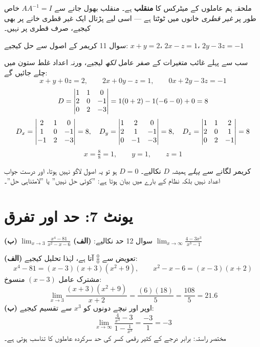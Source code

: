 \begin{ghalti}
ملحقہ ہم عاملوں کے میٹرکس کا \textbf{منقلب} ہے۔ منقلب بھول جانے سے
\(AA^{-1}=I\) خاص طور پر \emph{غیر قطری} خانوں میں ٹوٹتا ہے --- اسی لیے پڑتال
ایک غیر قطری خانے پر بھی کیجیے، صرف قطری پر نہیں۔
\end{ghalti}

\begin{sawal}{سوال \textenglish{11}}
کریمر کے اصول سے حل کیجیے: \quad
\(x+y=2\)، \quad \(2x-z=1\)، \quad \(2y-3z=-1\)
\end{sawal}

\begin{hal}
سب سے پہلے غائب متغیرات کے صفر عامل \emph{لکھ} لیجیے، ورنہ اعداد غلط ستون میں
چلے جائیں گے:
\[
x+y+0z=2,\qquad 2x+0y-z=1,\qquad 0x+2y-3z=-1
\]
\[
D=\begin{vmatrix}1&1&0\\2&0&-1\\0&2&-3\end{vmatrix}=1(0+2)-1(-6-0)+0=8
\]
\[
D_x=\begin{vmatrix}2&1&0\\1&0&-1\\-1&2&-3\end{vmatrix}=8,\quad
D_y=\begin{vmatrix}1&2&0\\2&1&-1\\0&-1&-3\end{vmatrix}=8,\quad
D_z=\begin{vmatrix}1&1&2\\2&0&1\\0&2&-1\end{vmatrix}=8
\]
\[
x=\tfrac88=1,\qquad y=1,\qquad z=1
\]

\end{hal}

\begin{ghalti}
کریمر لگانے سے \emph{پہلے} ہمیشہ \(D\) نکالیے۔ \(D=0\) ہو تو یہ اصول لاگو نہیں
ہوتا، اور درست جواب اعداد نہیں بلکہ نظام کے بارے میں بیان ہوتا ہے: ''کوئی حل
نہیں'' یا ''لامتناہی حل''۔
\end{ghalti}

\section*{یونٹ \textenglish{7}: حد اور تفرق}

\begin{sawal}{سوال \textenglish{12}}
حد نکالیے: \quad
\textbf{(الف)} \(\displaystyle\lim_{x\to 3}\frac{x^{4}-81}{x^{2}-x-6}\) \qquad
\textbf{(ب)} \(\displaystyle\lim_{x\to \infty}\frac{4-3x^{3}}{x^{3}-1}\)
\end{sawal}

\begin{hal}
\textbf{(الف)} تعویض سے \(\tfrac00\) آتا ہے، لہٰذا تحلیل کیجیے:
\[
x^{4}-81=(x-3)(x+3)(x^{2}+9),\qquad x^{2}-x-6=(x-3)(x+2)
\]
مشترک عامل \((x-3)\) منسوخ:
\[
\lim_{x\to3}\frac{(x+3)(x^{2}+9)}{x+2}=\frac{(6)(18)}{5}=\frac{108}{5}=21.6
\]
\textbf{(ب)} اوپر اور نیچے دونوں کو \(x^{3}\) سے تقسیم کیجیے:
\[
\lim_{x\to\infty}\frac{\tfrac{4}{x^{3}}-3}{1-\tfrac{1}{x^{3}}}=\frac{-3}{1}=-3
\]
مختصر راستہ: برابر درجے کے کثیر رقمی کسر کی حد سرکردہ عاملوں کا تناسب ہوتی ہے۔

\end{hal}


